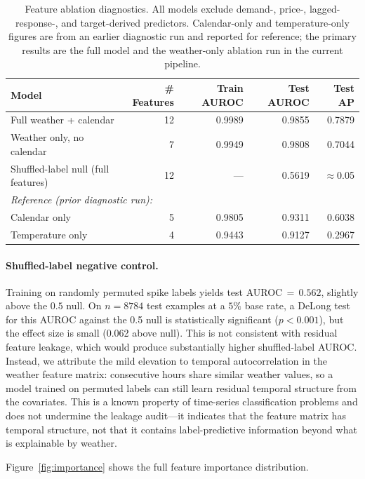 \documentclass{article}
\begin{document}
\begin{table}[t]
\centering
\caption{Feature ablation diagnostics. All models exclude demand-, price-,
lagged-response-, and target-derived predictors. Calendar-only and
temperature-only figures are from an earlier diagnostic run and reported
for reference; the primary results are the full model and the weather-only
ablation run in the current pipeline.}
\label{tab:ablation}
\begin{tabular}{lrrrr}
\toprule
Model & \# Features & Train AUROC & Test AUROC & Test AP \\
\midrule
Full weather + calendar & 12 & 0.9989 & 0.9855 & 0.7879 \\
Weather only, no calendar & 7 & 0.9949 & 0.9808 & 0.7044 \\
Shuffled-label null (full features) & 12 & --- & 0.5619 & $\approx$0.05 \\
\midrule
\multicolumn{5}{l}{\textit{Reference (prior diagnostic run):}} \\
Calendar only & 5 & 0.9805 & 0.9311 & 0.6038 \\
Temperature only & 4 & 0.9443 & 0.9127 & 0.2967 \\
\bottomrule
\end{tabular}
\end{table}

\paragraph{Shuffled-label negative control.}
Training on randomly permuted spike labels yields test AUROC\,${=}\,0.562$,
slightly above the $0.5$ null. On $n=8784$ test examples at a $5\%$ base
rate, a DeLong test for this AUROC against the 0.5 null is statistically
significant ($p < 0.001$), but the effect size is small (0.062 above null).
This is not consistent with residual feature leakage, which would produce
substantially higher shuffled-label AUROC. Instead, we attribute the mild
elevation to temporal autocorrelation in the weather feature matrix:
consecutive hours share similar weather values, so a model trained on
permuted labels can still learn residual temporal structure from the
covariates. This is a known property of time-series classification problems
\citep{barber2023} and does not undermine the leakage audit---it indicates
that the feature matrix has temporal structure, not that it contains
label-predictive information beyond what is explainable by weather.

Figure~\ref{fig:importance} shows the full feature importance distribution.
\end{document}
